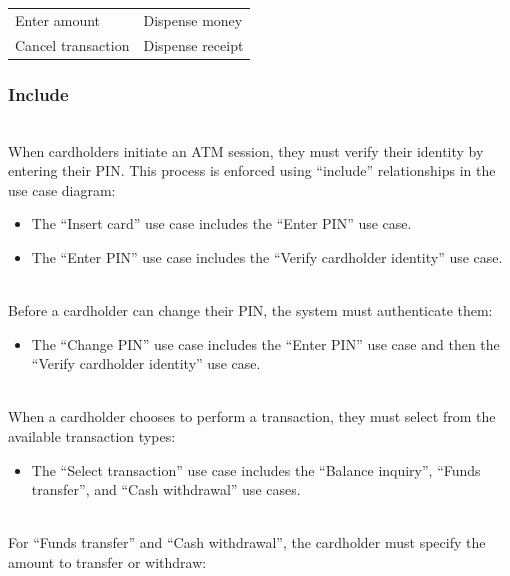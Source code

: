 \begin{center}
{\begin{longtable}[]{@{}
>{\raggedright\arraybackslash} p{}
>{\raggedright\arraybackslash} p{}@{}}
\begin{minipage}[t]{\linewidth}
Enter amount
\end{minipage} & \begin{minipage}[t]{\linewidth}\raggedright
Dispense money
\end{minipage} \\
\begin{minipage}[t]{\linewidth}\raggedright
Cancel transaction
\end{minipage} & \begin{minipage}[t]{\linewidth}\raggedright
Dispense receipt
\end{minipage} \\
\end{longtable}
}
\end{center}

\subsubsection{Include}\label{guYaczFFXYfD3wD7jLEZB}
\\
When cardholders initiate an ATM session, they must verify their identity by entering their PIN. This process is enforced using ``include'' relationships in the use case diagram:

\begin{itemize}
\item
\protect{}\label{0gRKiNPrT-95pBtAqSBaf}
The ``Insert card'' use case includes the ``Enter PIN'' use case.
\item
\protect{}\label{vx5pM9WS7bZXuLIN0wYVE}
The ``Enter PIN'' use case includes the ``Verify cardholder identity'' use case.
\end{itemize}
\\
Before a cardholder can change their PIN, the system must authenticate them:

\begin{itemize}
\item
\protect{}\label{K1N2JSv8iC4i1o8fVHzry}
The ``Change PIN'' use case includes the ``Enter PIN'' use case and then the ``Verify cardholder identity'' use case.
\end{itemize}
\\
When a cardholder chooses to perform a transaction, they must select from the available transaction types:

\begin{itemize}
\item
\protect{}\label{qyG1vmcyMKGnKxIW4Gv-N}
The ``Select transaction'' use case includes the ``Balance inquiry'', ``Funds transfer'', and ``Cash withdrawal'' use cases.
\end{itemize}
\\
For ``Funds transfer'' and ``Cash withdrawal'', the cardholder must specify the amount to transfer or withdraw:

